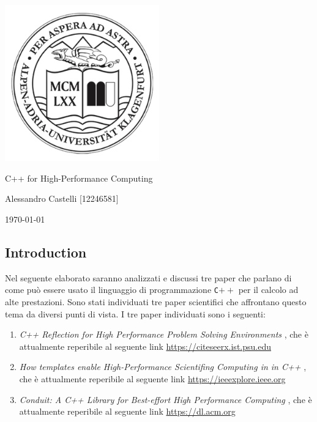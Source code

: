 \documentclass[11pt]{article}
\begin{document}
\begin{titlepage}
    \centering
    \includegraphics[width=0.5\textwidth]{aau.png}
    \vfill
    \begin{center}
        {\LARGE C++ for High-Performance Computing \par}
        \vspace{0.5cm}
        {\large Alessandro Castelli [12246581] \par}
        \vspace{0.5cm}
        {\large \today \par}
    \end{center}
    \vfill
\end{titlepage}

\begin{multicols*}{2}[\columnsep=1cm]
    
    \section{Introduction}
    Nel seguente elaborato saranno analizzati e discussi tre paper che parlano di come può essere usato il linguaggio di programmazione \texttt{C$++$} per il calcolo ad alte prestazioni.
    Sono stati individuati tre paper scientifici che affrontano questo tema da diversi punti di vista.
    I tre paper individuati sono i seguenti:
    \begin{enumerate}
        \item \textit{C++ Reflection for High Performance Problem Solving Environments} \cite{Article1}, che è attualmente reperibile al seguente link \href{https://citeseerx.ist.psu.edu/document?repid=rep1&type=pdf&doi=2058bb40e6b80504ba1084452fd9c126cd19f891}{https://citeseerx.ist.psu.edu}
        \item \textit{How templates enable High-Performance Scientifing Computing in in C++} \cite{Article2}, che è attualmente reperibile al seguente link \href{https://ieeexplore.ieee.org/abstract/document/774843?casa_token=YqZfo7t12KoAAAAA:aUt-msPVNEAtzfVwO4h_-R_r7IPTFs7vHYHbAtsOdDE83PlNvB8gkNl5maWpHYBU5QkS3cUp0R8}{https://ieeexplore.ieee.org}
        \item \textit{Conduit: A C++ Library for Best-effort High Performance Computing} \cite{Article3}, che è attualmente reperibile al seguente link \href{https://dl.acm.org/doi/abs/10.1145/3449726.3463205}{https://dl.acm.org}
    \end{enumerate}


\end{multicols*}



\end{document}
